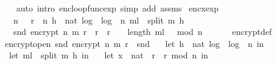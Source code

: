 \begin{isabellebody}
%
\isadelimproof
\ \ %
\endisadelimproof
%
\isatagproof
{}\isamarkupfalse%
\ {\isacharparenleft}{\kern0pt}auto\ intro{\isacharcolon}{\kern0pt}\ enc{\isacharunderscore}{\kern0pt}loop{\isacharunderscore}{\kern0pt}func{\isacharunderscore}{\kern0pt}exp\ simp\ add{\isacharcolon}{\kern0pt}\ assms{\isacharparenright}{\kern0pt}%
\endisatagproof
{\isafoldproof}%
%
\isadelimproof
\isanewline
%
\endisadelimproof
\isanewline
{}\isamarkupfalse%
\ enc{\isacharunderscore}{\kern0pt}x{\isacharunderscore}{\kern0pt}exp{\isacharcolon}{\kern0pt}\ \isanewline
\ \ \ {\isachardoublequoteopen}n\ {\isachargreater}{\kern0pt}\ {}{\isachardoublequoteclose}\ {\isachardoublequoteopen}r\ {\isacharless}{\kern0pt}\ n{\isachardoublequoteclose}\ {\isachardoublequoteopen}h\ {\isacharequal}{\kern0pt}\ nat\ {\isasymlfloor}log\ {}\ {\isacharparenleft}{\kern0pt}log\ {}\ n{\isacharparenright}{\kern0pt}{\isasymrfloor}{\isachardoublequoteclose}\ {\isachardoublequoteopen}m{\isacharunderscore}{\kern0pt}l\ {\isacharequal}{\kern0pt}\ split\ m\ h{\isachardoublequoteclose}\isanewline
\ \ \ {\isachardoublequoteopen}snd\ {\isacharparenleft}{\kern0pt}encrypt\ n\ m\ r{\isacharparenright}{\kern0pt}\ {\isacharequal}{\kern0pt}\ {\isacharparenleft}{\kern0pt}r\ {\isacharasterisk}{\kern0pt}\ r{\isacharparenright}{\kern0pt}\ {\isacharcircum}{\kern0pt}\ {\isacharparenleft}{\kern0pt}{}\ {\isacharcircum}{\kern0pt}\ {\isacharparenleft}{\kern0pt}length\ m{\isacharunderscore}{\kern0pt}l\ {\isacharplus}{\kern0pt}\ {}{\isacharparenright}{\kern0pt}{\isacharparenright}{\kern0pt}\ mod\ n{\isachardoublequoteclose}\isanewline
%
\isadelimproof
%
\endisadelimproof
%
\isatagproof
{}\isamarkupfalse%
\ {\isacharminus}{\kern0pt}\ \isanewline
\ \ \isamarkupfalse%
\ encrypt{\isacharunderscore}{\kern0pt}def\ \isamarkupfalse%
\ encrypt{\isacharunderscore}{\kern0pt}open{\isacharcolon}{\kern0pt}\ {\isachardoublequoteopen}snd\ {\isacharparenleft}{\kern0pt}encrypt\ n\ m\ r{\isacharparenright}{\kern0pt}\ {\isacharequal}{\kern0pt}\ snd\ {\isacharparenleft}{\kern0pt}\isanewline
\ \ let\ h\ {\isacharequal}{\kern0pt}\ nat\ {\isasymlfloor}log\ {}\ {\isacharparenleft}{\kern0pt}log\ {}\ n{\isacharparenright}{\kern0pt}{\isasymrfloor}\ in\ \isanewline
\ \ let\ m{\isacharunderscore}{\kern0pt}l\ {\isacharequal}{\kern0pt}\ split\ m\ h\ in\ \isanewline
\ \ let\ {\isacharparenleft}{\kern0pt}x{\isacharunderscore}{\kern0pt}{}\ {\isacharcolon}{\kern0pt}{\isacharcolon}{\kern0pt}\ nat{\isacharparenright}{\kern0pt}\ {\isacharequal}{\kern0pt}\ {\isacharparenleft}{\kern0pt}r\ {\isacharasterisk}{\kern0pt}\ r{\isacharparenright}{\kern0pt}\ mod\ n\ in\ \isanewline

\end{isabellebody}
